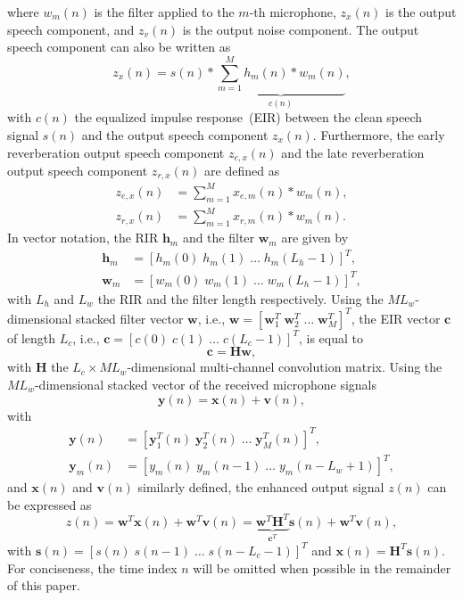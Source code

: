 \documentclass{aes60i}
\begin{document}
where $w_m(n)$ is the filter applied to the $m$-th microphone, $z_x(n)$ is the output speech component, and $z_v(n)$ is the output noise component.
The output speech component can also be written as
\begin{equation}
z_x(n) = s(n) \ast \underbrace{\sum_{m = 1}^M h_m(n) \ast w_m(n)}_{c(n)},
\end{equation}
with $c(n)$ the equalized impulse response~(EIR) between the clean speech signal $s(n)$ and the output speech component $z_x(n)$.
Furthermore, the early reverberation output speech component $z_{e,x}(n)$ and the late reverberation output speech component $z_{r,x}(n)$ are defined as
\begin{align}
\label{eq: er_out}
z_{e,x}(n) & = \sum_{m=1}^M x_{e,m}(n) \ast w_m(n), \\
\label{eq: rr_out}
z_{r,x}(n) & = \sum_{m=1}^M x_{r,m}(n) \ast w_m(n).
\end{align}
In vector notation, the RIR $\mathbf{h}_m$ and the filter $\mathbf{w}_m$ are given by
\begin{align}
\mathbf{h}_m &= [h_m(0) \; h_m(1) \; \ldots \; h_m(L_h-1)]^T, \\
\mathbf{w}_m &= [w_m(0) \; w_m(1) \; \ldots \; w_m(L_h-1)]^T,
\end{align}
with $L_h$ and $L_w$ the RIR and the filter length respectively.
Using the $ML_w$-dimensional stacked filter vector $\mathbf{w}$, i.e., $\mathbf{w} = [\mathbf{w}^T_1 \; \mathbf{w}^T_2 \; \ldots \; \mathbf{w}^T_M]^T$, the EIR vector $\mathbf{c}$ of length $L_c$, i.e., $\mathbf{c} = [c(0) \; c(1) \; \ldots \; c(L_c-1)]^T$, is equal to
\begin{equation}
\label{eq: eir}
\mathbf{c} = \mathbf{H}\mathbf{w},
\end{equation}
with $\mathbf{H}$  the $L_c \times ML_w$-dimensional multi-channel convolution matrix.
Using the $ML_w$-dimensional stacked vector of the received microphone signals
\begin{equation}
\mathbf{y}(n) = \mathbf{x}(n) + \mathbf{v}(n),
\end{equation}
with
\begin{align}
\label{eq: ymn}
\mathbf{y}(n) & = [\mathbf{y}^T_1(n) \; \mathbf{y}^T_2(n) \; \ldots \; \mathbf{y}^T_M(n)]^T, \\
\mathbf{y}_m(n) & = [y_m(n) \; y_m(n-1) \; \ldots \; y_m(n-L_w+1)]^T,
\end{align}
and $\mathbf{x}(n)$ and $\mathbf{v}(n)$ similarly defined, the enhanced output signal $z(n)$ can be expressed as
\begin{equation}
z(n) =  \mathbf{w}^T\mathbf{x}(n) + \mathbf{w}^T\mathbf{v}(n) = \underbrace{\mathbf{w}^T\mathbf{H}^T}_{\mathbf{c}^T}\mathbf{s}(n) + \mathbf{w}^T\mathbf{v}(n),
\end{equation}
with $\mathbf{s}(n) = [s(n) \; s(n-1) \; \ldots \; s(n-L_c-1)]^T$ and $\mathbf{x}(n) = \mathbf{H}^T \mathbf{s}(n)$.
For conciseness, the time index $n$ will be omitted when possible in the remainder of this paper.
\end{document}

